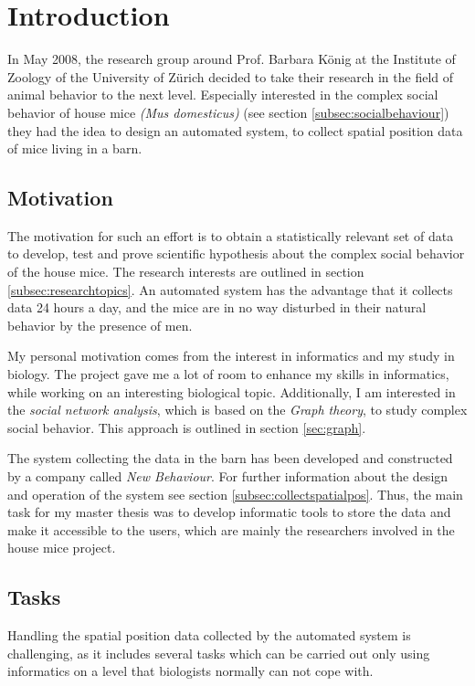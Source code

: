 \newpage

\section{Introduction}
\label{sec:introduction}

In May 2008, the research group around Prof. Barbara K\"onig at the Institute of Zoology of the University of Z\"urich decided to take their research in the field of animal behavior to the next level. Especially interested in the complex social behavior of house mice \textit{(Mus domesticus)} (see section \ref{subsec:socialbehaviour}) they had the idea to design an automated system, to collect spatial position data of mice living in a barn.

\subsection{Motivation}
\label{subsec:motivation}
The motivation for such an effort is to obtain a statistically relevant set of data to develop, test and prove scientific hypothesis about the complex social behavior of the house mice. The research interests are outlined in section \ref{subsec:researchtopics}. An automated system has the advantage that it collects data 24 hours a day, and the mice are in no way disturbed in their natural behavior by the presence of men.

My personal motivation comes from the interest in informatics and my study in biology. The project gave me a lot of room to enhance my skills in informatics, while working on an interesting biological topic. Additionally, I am interested in the \textit{social network analysis}, which is based on the \textit{Graph theory}\cite{wiki:graph_theory}, to study complex social behavior. This approach is outlined in section \ref{sec:graph}.

The system collecting the data in the barn has been developed and constructed by a company called \textit{New Behaviour}. For further information about the design and operation of the system see section \ref{subsec:collectspatialpos}. Thus, the main task for my master thesis was to develop informatic tools to store the data and make it accessible to the users, which are mainly the researchers involved in the house mice project. 

\subsection{Tasks}
\label{subsec:task}
Handling the spatial position data collected by the automated system is challenging, as it includes several tasks which can be carried out only using informatics on a level that biologists normally can not cope with.

